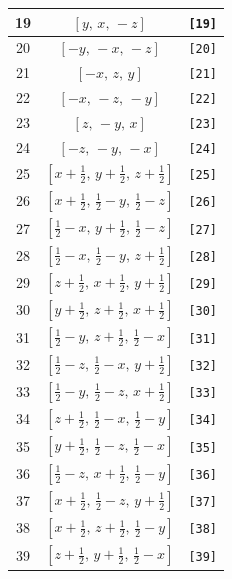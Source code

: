 \documentclass[fleqn,8pt]{jsarticle}
\begin{document}
\begin{longtable}{ccc}
19 & $\left[ y,\, x,\, - z \right]$ & {\tt [19]} \\ \hline
20 & $\left[ - y,\, - x,\, - z \right]$ & {\tt [20]} \\ \hline
21 & $\left[ - x,\, z,\, y \right]$ & {\tt [21]} \\ \hline
22 & $\left[ - x,\, - z,\, - y \right]$ & {\tt [22]} \\ \hline
23 & $\left[ z,\, - y,\, x \right]$ & {\tt [23]} \\ \hline
24 & $\left[ - z,\, - y,\, - x \right]$ & {\tt [24]} \\ \hline
25 & $\left[ x + \frac{1}{2},\, y + \frac{1}{2},\, z + \frac{1}{2} \right]$ & {\tt [25]} \\ \hline
26 & $\left[ x + \frac{1}{2},\, \frac{1}{2} - y,\, \frac{1}{2} - z \right]$ & {\tt [26]} \\ \hline
27 & $\left[ \frac{1}{2} - x,\, y + \frac{1}{2},\, \frac{1}{2} - z \right]$ & {\tt [27]} \\ \hline
28 & $\left[ \frac{1}{2} - x,\, \frac{1}{2} - y,\, z + \frac{1}{2} \right]$ & {\tt [28]} \\ \hline
29 & $\left[ z + \frac{1}{2},\, x + \frac{1}{2},\, y + \frac{1}{2} \right]$ & {\tt [29]} \\ \hline
30 & $\left[ y + \frac{1}{2},\, z + \frac{1}{2},\, x + \frac{1}{2} \right]$ & {\tt [30]} \\ \hline
31 & $\left[ \frac{1}{2} - y,\, z + \frac{1}{2},\, \frac{1}{2} - x \right]$ & {\tt [31]} \\ \hline
32 & $\left[ \frac{1}{2} - z,\, \frac{1}{2} - x,\, y + \frac{1}{2} \right]$ & {\tt [32]} \\ \hline
33 & $\left[ \frac{1}{2} - y,\, \frac{1}{2} - z,\, x + \frac{1}{2} \right]$ & {\tt [33]} \\ \hline
34 & $\left[ z + \frac{1}{2},\, \frac{1}{2} - x,\, \frac{1}{2} - y \right]$ & {\tt [34]} \\ \hline
35 & $\left[ y + \frac{1}{2},\, \frac{1}{2} - z,\, \frac{1}{2} - x \right]$ & {\tt [35]} \\ \hline
36 & $\left[ \frac{1}{2} - z,\, x + \frac{1}{2},\, \frac{1}{2} - y \right]$ & {\tt [36]} \\ \hline
37 & $\left[ x + \frac{1}{2},\, \frac{1}{2} - z,\, y + \frac{1}{2} \right]$ & {\tt [37]} \\ \hline
38 & $\left[ x + \frac{1}{2},\, z + \frac{1}{2},\, \frac{1}{2} - y \right]$ & {\tt [38]} \\ \hline
39 & $\left[ z + \frac{1}{2},\, y + \frac{1}{2},\, \frac{1}{2} - x \right]$ & {\tt [39]} \\ \hline

\end{longtable}
\end{document}
